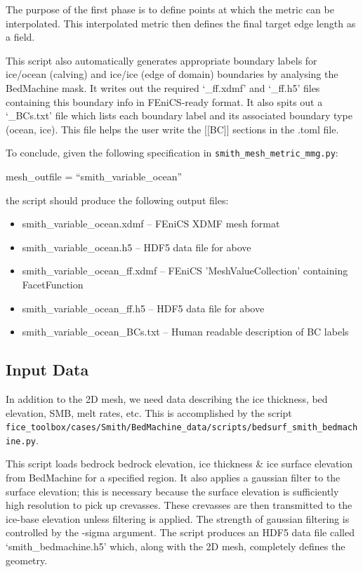 \documentclass[11pt, reqno, nocenter]{article}
\begin{document}
The purpose of the first phase is to define points at which the metric can be interpolated. This interpolated metric then defines the final target edge length as a field.

This script also automatically generates appropriate boundary labels for ice/ocean (calving) and ice/ice (edge of domain) boundaries by analysing the BedMachine mask. It writes out the required `\_ff.xdmf' and `\_ff.h5' files containing this boundary info in FEniCS-ready format. It also spits out a `\_BCs.txt' file which lists each boundary label and its associated boundary type (ocean, ice). This file helps the user write the [[BC]] sections in the .toml file.

To conclude, given the following specification in {\tt smith\_mesh\_metric\_mmg.py}:

\begin{spverbatim}
mesh_outfile = ``smith_variable_ocean''
\end{spverbatim}

the script should produce the following output files:

\begin{itemize}
\item smith\_variable\_ocean.xdmf -- FEniCS XDMF mesh format
\item smith\_variable\_ocean.h5 -- HDF5 data file for above
\item smith\_variable\_ocean\_ff.xdmf -- FEniCS 'MeshValueCollection' containing FacetFunction
\item smith\_variable\_ocean\_ff.h5 -- HDF5 data file for above
\item smith\_variable\_ocean\_BCs.txt -- Human readable description of BC labels
\end{itemize}

\subsection{Input Data}

In addition to the 2D mesh, we need data describing the ice thickness, bed elevation, SMB, melt rates, etc. This is accomplished by the script\\
 {\tt fice\_toolbox/cases/Smith/BedMachine\_data/scripts/bedsurf\_smith\_bedmachine.py}.

This script loads bedrock bedrock elevation, ice thickness \& ice surface elevation from BedMachine for a specified region. It also applies a gaussian filter to the surface elevation; this is necessary because the surface elevation is sufficiently high resolution to pick up crevasses. These crevasses are then transmitted to the ice-base elevation unless filtering is applied. The strength of gaussian filtering is controlled by the -sigma argument. The script produces an HDF5 data file called `smith\_bedmachine.h5' which, along with the 2D mesh, completely defines the geometry.
\end{document}
